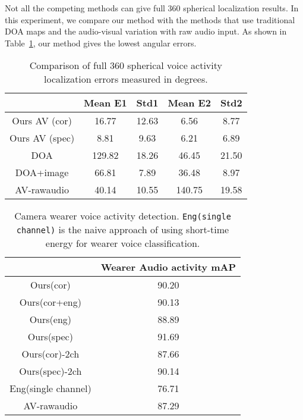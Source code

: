 \documentclass[10pt,twocolumn,letterpaper]{article}
\begin{document}
Not all the competing methods can give full 360 spherical localization results.
In this experiment, we compare our method with the methods that use traditional DOA maps and the audio-visual variation with raw audio input.
As shown in Table~\ref{tab:vloc360}, our method gives the lowest angular errors. 


\setlength{\tabcolsep}{1pt}
\begin{table}[tbh]
  \small	
  \centering
  \begin{tabular}{ c | c | c | c | c }
    \hline
				     & Mean E1 & Std1   & Mean E2 & Std2  \\ \hline
                      Ours AV (cor) & 16.77   & 12.63  & 6.56   & 8.77 \\
		      Ours AV (spec) & 8.81   & 9.63  & 6.21   & 6.89 \\
		      DOA            & 129.82  & 18.26  & 46.45   & 21.50 \\
                      DOA+image       & 66.81  & 7.89  & 36.48   & 8.97 \\
		      AV-rawaudio    & 40.14     &  10.55    &  140.75     &  19.58   \\
    \hline
  \end{tabular}
\caption{Comparison of full 360 spherical voice activity localization errors measured in degrees.}
        \label{tab:vloc360}
\vspace{-10pt}	
\end{table}


\setlength{\tabcolsep}{1pt}
\begin{table}[tbh]	
  \small	
  \centering	
  \begin{tabular}{ c | c  }
    \hline
		      & Wearer Audio activity mAP  \\ \hline
		      Ours(cor) & 90.20  \\               
	              Ours(cor+eng) & 90.13  \\    
		      Ours(eng) & 88.89   \\
		      Ours(spec) & 91.69  \\
		      Ours(cor)-2ch & 87.66   \\
		      Ours(spec)-2ch & 90.14     \\
		      Eng(single channel) & 76.71 \\
		      AV-rawaudio & 87.29 \\

    \hline
  \end{tabular}
\caption{Camera wearer voice activity detection. \texttt{Eng(single channel)} is the 
	naive approach of using short-time energy for wearer voice classification.}
	\label{tab:wearer}
\vspace{-10pt}	
\end{table}
\end{document}
